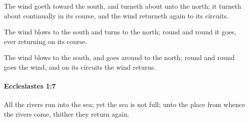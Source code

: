 			\begin{versebox}
					\item[BHS] 
					\item[LXX] 
					\item[ASV] The wind goeth toward the south, and turneth about unto the north; it turneth about continually in its course, and the wind returneth again to its circuits.
					\item[NIV] The wind blows to the south and turns to the north; round and round it goes, ever returning on its course.
					\item[NRSV] The wind blows to the south, and goes around to the north; round and round goes the wind, and on its circuits the wind returns.
			\end{versebox}

		\paragraph{Ecclesiastes 1:7} %
			\label{ECCLESIASTES-1-7}

			All the rivers run into the sea; yet the sea is not full; unto the place from whence the rivers come, thither they return again.

